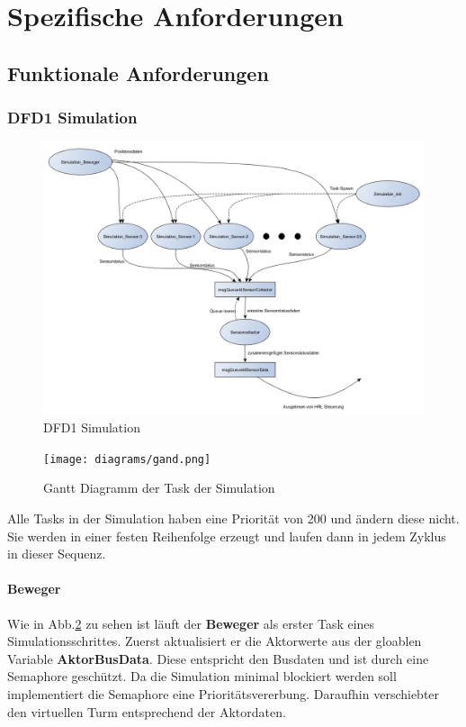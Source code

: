 \section{Spezifische Anforderungen}
\subsection{Funktionale Anforderungen}
\subsubsection{DFD1 Simulation}
\begin{figure}[H]
	\centering
  \includegraphics[width=\textwidth]{DFD/dfd1_simulation1_1.png}
	\caption{DFD1 Simulation}
	\label{fig1}
\end{figure}
\begin{figure}[H]
	\centering
  \texttt{[image: diagrams/gand.png]}
	\caption{Gantt Diagramm der Task der Simulation}
	\label{gantt}
\end{figure}

Alle Tasks in der Simulation haben eine Priorität von 200 und ändern diese nicht. Sie werden in einer festen Reihenfolge erzeugt und laufen dann in jedem Zyklus in dieser Sequenz.

\paragraph{Beweger}
Wie in Abb.\ref{gantt} zu sehen ist läuft der \textbf{Beweger} als erster Task eines Simulationsschrittes. Zuerst aktualisiert er die Aktorwerte aus der gloablen Variable \textbf{AktorBusData}. Diese entspricht den Busdaten  und ist durch eine Semaphore geschützt. Da die Simulation minimal blockiert werden soll implementiert die Semaphore eine Prioritätsvererbung. Daraufhin \glqq verschiebt\grqq   er den virtuellen Turm entsprechend der Aktordaten.

